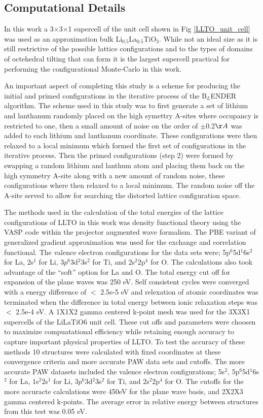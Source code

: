 \documentclass[aps,prl,reprint,superscriptaddress,showkeys]{revtex4-1}
\begin{document}
\subsection{Computational Details}
In this work a 3$\times$3$\times$1 supercell of the unit cell shown in Fig \ref{LLTO_unit_cell} was used as an approximation bulk Li$_{0.5}$La$_{0.5}$TiO$_{3}$. While not an ideal size as it is still restrictive of the possible lattice configurations and to the types of domains of octehedral tilting that can form it is the largest supercell practical for performing the configurational Monte-Carlo in this work. 

An important aspect of completing this study is a scheme for producing the initial and primed configurations in the iterative process of the B$_L$ENDER algorithm. The scheme used in this study was to first generate a set of lithium and lanthanum randomly placed on the high symettry A-sites where occupancy is restricted to one, then a small amount of noise on the order of $\pm$0.2$\AA$ was added to each lithium and lanthanum coordinate. These configurations were then relaxed to a local minimum which formed the first set of configurations in the iterative process.  Then the primed configurations (step 2) were formed by swapping a random lithium and lanthum atom and placing them back on the high symmetry A-site along with a new amount of random noise, these configurations where then relaxed to a local minimum. The random noise off the A-site served to allow for searching the distorted lattice configuration space. 

The methods used in the calculation of the total energies of the lattice configurations of LLTO in this work was density functional theory using the VASP code\cite{Vasp1,Vasp2,Vasp3,Vasp4} within the projector augmented wave formalism\cite{Blochl}. The PBE variant of generalized gradient approximation was used for the exchange and correlation functional\cite{PBE}. The valence electron configurations for the data sets were; 5p$^{6}$5d$^{1}$6s$^{2}$ for La, 2s$^{1}$ for Li, 3$p^{6}$3d$^{2}$3s$^{2}$ for Ti, and 2s$^{2}$2p$^{4}$ for O. The calculations also took advantage of the ``soft'' option for La and O.   The total energy cut off for expansion of the plane waves was 250 eV.  Self consistent cycles were converged with a energy difference of $<$ 2.5e-5 eV and relexation  of atomic coordinates was terminated when the difference in total energy between ionic relaxation steps was $<$ 2.5e-4 eV. A 1X1X2 gamma centered k-point mesh was used for the 3X3X1 supercells of the LiLaTiO6 unit cell. These cut offs and parameters were choosen to maximize compuatational efficiency while retaining enough accuracy to capture important physical properties of LLTO. To test the accuracy of these methods 10 structures were calculated with fixed coordinates at these convergence criteria and more accurate PAW data sets and cutoffs. The more accurate PAW datasets included the valence electron configurations; 5s$^{2}$, 5p$^{6}$5d$^{1}$6s$^{2}$ for La, 1s$^2$2s$^{1}$ for Li, 3$p^{6}$3d$^{2}$3s$^{2}$ for Ti, and 2s$^{2}$2p$^{4}$ for O.  The cutoffs for the more accuracte calculations were 450eV for the plane wave basis, and 2X2X3 gamma centered k-points. The average error in relative energy between structures from this test was 0.05 eV.
\end{document}
